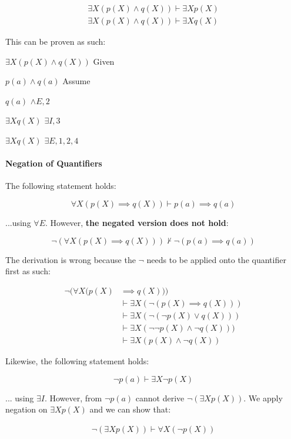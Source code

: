\documentclass{article}
\newcommand{\indentitem}{\addtolength\itemindent{20pt}}
\theoremstyle{plain}
\theoremstyle{definition}
\begin{document}
\begin{multicols}{2}
 \begin{align*}
 \exists X (p(X) \land q(X)) \vdash \exists X p(X)\\
 \exists X (p(X) \land q(X)) \vdash \exists X q(X)
 \end{align*}
 
 This can be proven as such:
 
 \begin{enumerate}
 \item $\exists X (p(X) \land q(X))$ \hfill Given
 {\indentitem 
     \item $p(a) \land q(a)$ \hfill Assume
     \item $q(a)$ \hfill $\land E, 2$
     \item $\exists X q(X)$ \hfill $\exists I, 3$}
 \item $\exists X q(X)$ \hfill $\exists E, 1, 2, 4$
 \end{enumerate}
 
 \paragraph{Negation of Quantifiers} The following statement holds:
 
 $$\forall X (p(X) \implies q(X)) \vdash p(a) \implies q(a)$$
 
 ...using $\forall E$. However, {\bf the negated version does not hold}:

 $$\lnot (\forall X (p(X) \implies q(X))) \nvdash \lnot (p(a) \implies q(a))$$
 
 The derivation is wrong because the $\lnot$ needs to be applied onto the quantifier first as such:
 
 \begin{align*}
 \lnot (\forall X (p(X) &\implies q(X))) \\
 	 &\vdash \exists X (\lnot (p(X) \implies q(X)))\\
 	 &\vdash \exists X (\lnot (\lnot p(X) \lor q(X)))\\
 	 &\vdash \exists X (\lnot\lnot p(X) \land \lnot q(X)))\\
 	 &\vdash \exists X (p(X) \land \lnot q(X))
 \end{align*}
 
 Likewise, the following statement holds:
 
 $$\lnot p(a) \vdash \exists X \lnot p(X)$$
 
 ... using $\exists I$. However, from $\lnot p(a)$ cannot derive $\lnot (\exists X p(X))$. We apply negation on $\exists X p(X)$ and we can show that:

 \begin{align*}
 \lnot (\exists X p(X)) \vdash \forall X (\lnot p(X))
 \end{align*}
 
  \end{multicols}
\end{document}
